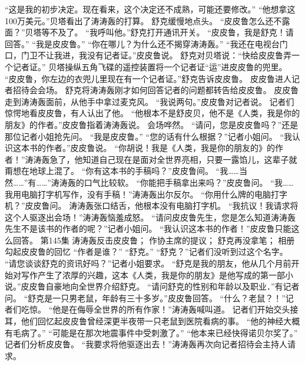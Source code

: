 \documentclass[a4paper,12pt,UTF8,twoside]{ctexbook}
\begin{document}
        “这是我的初步决定。现在看来，这个决定还不成熟，可能还要修改。” 
        “他想拿这100万美元。”贝塔看出了涛涛轰的打算。 
        舒克缓慢地点头。 
        “皮皮鲁怎么还不露面？”贝塔等不及了。 
        “我呼叫他。”舒克打开通讯开关。 
        “皮皮鲁，我是舒克！请回答。” 
        “我是皮皮鲁。” 
        “你在哪儿？为什么还不揭穿涛涛轰。” 
        “我还在电视台门口，门卫不让我进，我没有记者证。”皮皮鲁说。 
        舒克对贝塔说：“快给皮皮鲁弄一个记者证。” 
        贝塔操纵五角飞碟的遥控装置将一个记者证“运”进皮皮鲁的兜里。 
        “皮皮鲁，你左边的衣兜儿里现在有一个记者证。”舒克告诉皮皮鲁。 
        皮皮鲁进人记者招待会会场。 
        舒克将涛涛轰刚才如何回答记者的问题都转告给皮皮鲁。 
        皮皮鲁走到涛涛轰面前，从他手中拿过麦克风。 
        “我说两句。”皮皮鲁对记者说。 
        记者们惊愕地看皮皮鲁，有人认出了他。 
        “他根本不是舒皮贝，他不是《人类，我是你的朋友》的作者。”皮皮鲁指着涛涛轰说。 
        会场哗然。 
        “请问，您是皮皮鲁吗？”还是那位记者小姐抢先问。 
        “我是皮皮鲁。” 
        “您的话有什么根据？”记者小姐问。 
        “我认识这本书的作者。”皮皮鲁说。 
        “你胡说！我是《人类，我是你的朋友的》的作者！”涛涛轰急了，他知道自己现在是面对全世界亮相，只要一露馅儿，这辈子就甭想在地球上混了。 
        “你有这本书的手稿吗？”皮皮鲁间。 
        “我……当然……”有……”涛涛轰的口气比较软。 
        “你能把手稿拿出来吗？”皮皮鲁问。 
        “我……我用电脑打字机写作，没有手稿！”涛涛轰出尔反尔。 
        “你用什么牌的电脑打字机？”皮皮鲁问。 
        涛涛轰张口结舌，他根本没有电脑打字机。 
        “我抗议！我请求将这个人驱逐出会场！”涛涛轰恼羞成怒。 
        “请问皮皮鲁先生，您是怎么知道涛涛轰先生不是该书的作者的呢？”记者小姐问。 
        “我认识这本书的作者！”皮皮鲁只能这么回答。   第145集 
        涛涛轰反击皮皮鲁； 
        作协主席的提议； 
        舒克再没拿笔； 
        相册勾起皮皮鲁的回忆   
        “作者是谁？” 
        “舒克。” 
        “舒克？”记者们没听到过这个名字。 
        “请您谈谈舒克的资讯好吗？”记者小姐要求。 
        “舒克是我的朋友，他从几个月前开始对写作产生了浓厚的兴趣，这本《人类，我是你的朋友》是他写成的第一部小说。”皮皮鲁自豪地向全世界介绍舒克。 
        “请问舒克的性别和年龄以及职业．”有记者问。 
        “舒克是一只男老鼠，年龄有三十多岁。”皮皮鲁回答。 
        “什么？老鼠？！”记者们吃惊。 
        “他是在侮辱全世界的所有作家！”涛涛轰喊叫道。 
        记者们开始交头接耳，他们回忆起皮皮鲁曾经深更半夜带一只老鼠到医院看病的事。 
        “他的神经大概有毛病了。” 
        “可能是在那次地震事件中受刺激了。” 
        “他本来已经快得诺贝尔奖了。” 
        记者们分析皮皮鲁。 
        “我要求将他驱逐出去！”涛涛轰再次向记者招待会主持人请求。 
\end{document}
